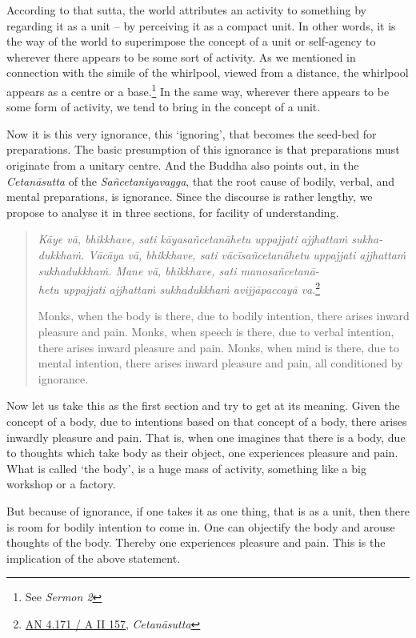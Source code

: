 According to that sutta, the world attributes an activity to something by regarding it as a unit -- by perceiving it as a compact unit. In other words, it is the way of the world to superimpose the concept of a unit or self-agency to wherever there appears to be some sort of activity. As we mentioned in connection with the simile of the whirlpool, viewed from a distance, the whirlpool appears as a centre or a base.\footnote{See \emph{Sermon 2}} In the same way, wherever there appears to be some form of activity, we tend to bring in the concept of a unit.

Now it is this very ignorance, this `ignoring', that becomes the seed-bed for preparations. The basic presumption of this ignorance is that preparations must originate from a unitary centre. And the Buddha also points out, in the \emph{Cetanāsutta} of the \emph{Sañcetaniyavagga}, that the root cause of bodily, verbal, and mental preparations, is ignorance. Since the discourse is rather lengthy, we propose to analyse it in three sections, for facility of understanding.

\begin{quote}
\emph{Kāye vā, bhikkhave, sati kāyasañcetanāhetu uppajjati ajjhattaṁ sukha-\\ dukkhaṁ. Vācāya vā, bhikkhave, sati vācīsañcetanāhetu uppajjati ajjhattaṁ sukhadukkhaṁ. Mane vā, bhikkhave, sati manosañcetanā-\\ hetu uppajjati ajjhattaṁ sukhadukkhaṁ avijjāpaccayā va}.\footnote{\href{https://suttacentral.net/an4.171/pli/ms}{AN 4.171 / A II 157}, \emph{Cetanāsutta}}

Monks, when the body is there, due to bodily intention, there arises inward pleasure and pain. Monks, when speech is there, due to verbal intention, there arises inward pleasure and pain. Monks, when mind is there, due to mental intention, there arises inward pleasure and pain, all conditioned by ignorance.
\end{quote}

Now let us take this as the first section and try to get at its meaning. Given the concept of a body, due to intentions based on that concept of a body, there arises inwardly pleasure and pain. That is, when one imagines that there is a body, due to thoughts which take body as their object, one experiences pleasure and pain. What is called `the body', is a huge mass of activity, something like a big workshop or a factory.

But because of ignorance, if one takes it as one thing, that is as a unit, then there is room for bodily intention to come in. One can objectify the body and arouse thoughts of the body. Thereby one experiences pleasure and pain. This is the implication of the above statement.


